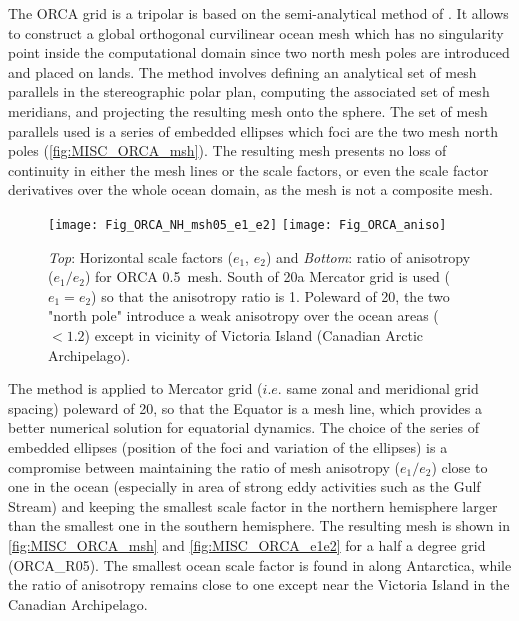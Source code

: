 \documentclass[../tex_main/NEMO_manual]{subfiles}
\begin{document}
The ORCA grid is a tripolar is based on the semi-analytical method of \citet{Madec_Imbard_CD96}. 
It allows to construct a global orthogonal curvilinear ocean mesh which has no singularity point inside 
the computational domain since two north mesh poles are introduced and placed on lands.
The method involves defining an analytical set of mesh parallels in the stereographic polar plan, 
computing the associated set of mesh meridians, and projecting the resulting mesh onto the sphere. 
The set of mesh parallels used is a series of embedded ellipses which foci are the two mesh north 
poles (\autoref{fig:MISC_ORCA_msh}). The resulting mesh presents no loss of continuity in 
either the mesh lines or the scale factors, or even the scale factor derivatives over the whole 
ocean domain, as the mesh is not a composite mesh. 
\begin{figure}[!tbp]  \begin{center}
\texttt{[image: Fig\_ORCA\_NH\_msh05\_e1\_e2]}
\texttt{[image: Fig\_ORCA\_aniso]}
\caption {  \protect\label{fig:MISC_ORCA_e1e2}
\textit{Top}: Horizontal scale factors ($e_1$, $e_2$) and 
\textit{Bottom}: ratio of anisotropy ($e_1 / e_2$)
for ORCA 0.5\deg ~mesh. South of 20\degN a Mercator grid is used ($e_1 = e_2$) 
so that the anisotropy ratio is 1. Poleward of 20\degN, the two "north pole" 
introduce a weak anisotropy over the ocean areas ($< 1.2$) except in vicinity of Victoria Island 
(Canadian Arctic Archipelago). }
\end{center}   \end{figure}


The method is applied to Mercator grid ($i.e.$ same zonal and meridional grid spacing) poleward 
of 20\degN, so that the Equator is a mesh line, which provides a better numerical solution 
for equatorial dynamics. The choice of the series of embedded ellipses (position of the foci and 
variation of the ellipses) is a compromise between maintaining  the ratio of mesh anisotropy 
($e_1 / e_2$) close to one in the ocean (especially in area of strong eddy activities such as 
the Gulf Stream) and keeping the smallest scale factor in the northern hemisphere larger 
than the smallest one in the southern hemisphere.
The resulting mesh is shown in \autoref{fig:MISC_ORCA_msh} and \autoref{fig:MISC_ORCA_e1e2} 
for a half a degree grid (ORCA\_R05).
The smallest ocean scale factor is found in along  Antarctica, while the ratio of anisotropy remains close to one except near the Victoria Island 
in the Canadian Archipelago. 
\end{document}
